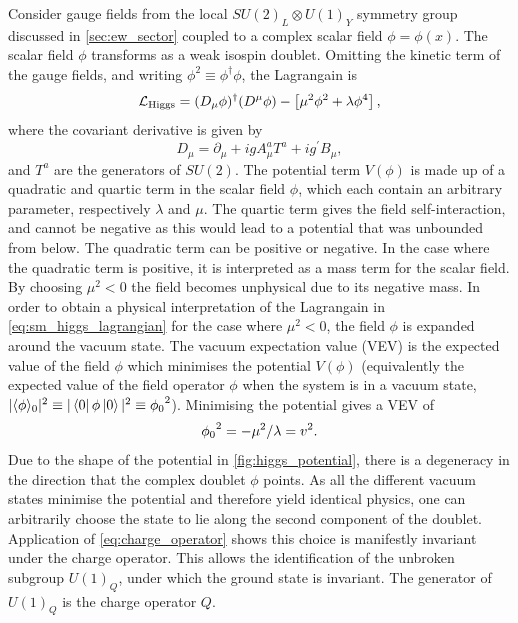 Consider gauge fields from the local $SU(2)_L \otimes U(1)_Y$ symmetry group discussed in \cref{sec:ew_sector} coupled to a complex scalar field $\phi = \phi(x)$. The scalar field $\phi$ transforms as a weak isospin doublet.
Omitting the kinetic term of the gauge fields, and writing $\phi^2 \equiv \phi^\dagger \phi$, the Lagrangain is
%
\begin{equation}\label{eq:sm_higgs_lagrangian}
  \mathcal{L}_{\textnormal{Higgs}} = 
  (D_\mu \phi)^\dagger (D^\mu \phi) - \left[ \mu^2 \phi^2 + \lambda \phi^4 \right],
\end{equation}
%
where the covariant derivative is given by
%
\begin{equation}\label{eq:sm_higgs_cov_derivative}
  D_\mu = \partial_\mu + i g A^a_\mu T^a + i g^\prime B_\mu ,
\end{equation}
%
and $T^a$ are the generators of $SU(2)$.
The potential term $V(\phi)$ is made up of a quadratic and quartic term in the scalar field $\phi$, which each contain an arbitrary parameter, respectively $\lambda$ and $\mu$.
The quartic term gives the field self-interaction, and cannot be negative as this would lead to a potential that was unbounded from below.
The quadratic term can be positive or negative.
In the case where the quadratic term is positive, it is interpreted as a mass term for the scalar field.
By choosing $\mu^2 < 0$ the field becomes unphysical due to its negative mass.
In order to obtain a physical interpretation of the Lagrangain in \cref{eq:sm_higgs_lagrangian} for the case where $\mu^2 < 0$, the field $\phi$ is expanded around the vacuum state.
The vacuum expectation value (VEV) is the expected value of the field $\phi$ which minimises the potential $V(\phi)$ (equivalently the expected value of the field operator $\phi$ when the system is in a vacuum state, $|\langle{\phi}\rangle_0|^2 \equiv |\left\langle 0 \right| \phi \left| 0 \right\rangle|^2 \equiv {\phi_0}^2$).
Minimising the potential gives a VEV of
%
\begin{equation}\label{eq:higgs_vev}
  {\phi_0}^2 = -\mu^2 / \lambda = v^2 .
\end{equation}
%
Due to the shape of the potential in \cref{fig:higgs_potential}, there is a degeneracy in the direction that the complex doublet $\phi$ points.
As all the different vacuum states minimise the potential and therefore yield identical physics, one can arbitrarily choose the state to lie along the second component of the doublet.
Application of \cref{eq:charge_operator} shows this choice is manifestly invariant under the charge operator.
This allows the identification of the unbroken subgroup $U(1)_Q$,  under which the ground state is invariant.
The generator of $U(1)_Q$ is the charge operator $Q$.

